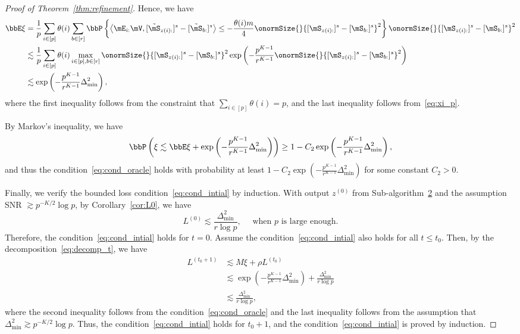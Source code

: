 \documentclass[lettersize,onecolumn,journal]{IEEEtran}
\theoremstyle{definition}
\theoremstyle{definition}
\newcommand{\of}[1]{\left(#1\right)}
\newcommand{\offf}[1]{\left\{#1\right\}}
\newcommand{\ang}[1]{\left\langle#1\right\rangle}
\begin{document}
\begin{proof}[Proof of Theorem~\ref{thm:refinement}]
    Hence, we have 
    \begin{align}
        \bbE \xi & =  \frac{1}{p} \sum_{i \in [p]} \theta(i) \sum_{b \in [r]} \bbP \offf{  \ang{ \mE_{i:} \mV, [  \tilde \mS_{z(i):} ]^s - [  \tilde \mS_{b:} ]^s }  \leq - \frac{\theta(i) m}{4} \onormSize{}{ [ \mS_{z(i):}  ]^s - [ \mS_{b:}  ]^s  }^2 } \onormSize{}{ [ \mS_{z(i):}  ]^s - [ \mS_{ b:}  ]^s  }^2 \\
        &\lesssim \frac{1}{p} \sum_{i \in [p]}  \theta(i) \max_{i \in [p], b \in [r]}  \onormSize{}{ [ \mS_{z(i):}  ]^s - [ \mS_{b:}  ]^s  }^2   \exp \of{  - \frac{p^{K-1}}{r^{K-1}}   \onormSize{}{ [ \mS_{z(i):}  ]^s - [ \mS_{b:}  ]^s  }^2 } \\
        & \lesssim  \exp \of{  - \frac{p^{K-1}}{r^{K-1}}   \Delta_{\min}^2 },
    \end{align}
    where the first inequality follows from the constraint that $\sum_{i \in [p]} \theta(i) = p$, and the last inequality follows from~\eqref{eq:xi_p}.
    
    By Markov's inequality, we have 
    \begin{equation}
        \bbP\of{ \xi \lesssim \bbE \xi + \exp \of{  - \frac{p^{K-1}}{r^{K-1}}   \Delta_{\min}^2 } } \geq 1 -  C_2 \exp \of{  - \frac{p^{K-1}}{r^{K-1}}   \Delta_{\min}^2 },
    \end{equation}
    and thus the condition~\eqref{eq:cond_oracle} holds with probability at least $1 -  C_2 \exp \of{  - \frac{p^{K-1}}{r^{K-1}}   \Delta_{\min}^2 }$ for some constant $C_2 > 0$.
    
    Finally, we verify the bounded loss condition~\eqref{eq:cond_intial} by induction.  With output $z^{(0)}$ from Sub-algorithm~\hyperref[alg:main]{2} and the assumption SNR $\gtrsim p^{-K/2} \log p$, by Corollary~\ref{cor:L0}, we have 
    \begin{equation}
        L^{(0)} \lesssim \frac{\Delta_{\min}^2}{r \log p},\quad \text{    when $p$ is large enough}.
    \end{equation}
Therefore, the condition~\eqref{eq:cond_intial} holds for $t = 0$. Assume the condition~\eqref{eq:cond_intial} also holds for all $t \leq t_0$. Then, by the decomposition~\eqref{eq:decomp_t}, we have 
    \begin{align}
         L^{(t_0+1)} &\lesssim M \xi + \rho L^{(t_0)} \\
         & \lesssim  \exp \of{  - \frac{p^{K-1}}{r^{K-1}}   \Delta_{\min}^2 } + \frac{\Delta_{\min}^2}{r \log p} \\
         & \lesssim \frac{\Delta_{\min}^2}{r\log p} ,
    \end{align}
    where the second inequality follows from the condition~\eqref{eq:cond_oracle} and the last inequality follows from the assumption that $\Delta_{\min}^2 \gtrsim p^{-K/2} \log p$. Thus, the condition~\eqref{eq:cond_intial} holds for $t_0 + 1$, and the condition~\eqref{eq:cond_intial} is proved by induction.
\end{proof}
\end{document}
